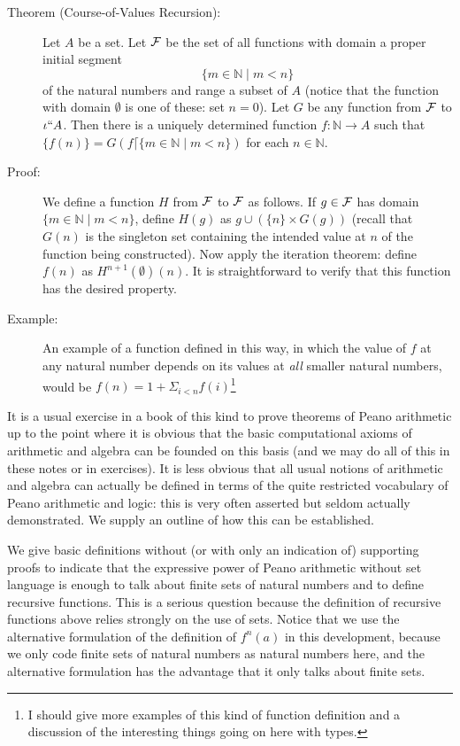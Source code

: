 \documentclass[12pt]{book}
\begin{document}
\begin{description}

\item[Theorem (Course-of-Values Recursion):] Let $A$ be a set.  Let
${\cal F}$ be the set of all functions with domain a proper initial
segment $$\{m \in{\mathbb N}\mid m <n\}$$ of the natural numbers and
range a subset of $A$ (notice that the function with domain
$\emptyset$ is one of these: set $n=0$).  Let $G$ be any function from
$\cal F$ to $\iota``A$.  Then there is a uniquely determined function
$f:{\mathbb N}\rightarrow A$ such that $\{f(n)\} = G(f \lceil \{m \in
{\mathbb N} \mid m < n\})$ for each $n \in {\mathbb N}$.

\item[Proof:] We define a function $H$ from ${\cal F}$ to ${\cal F}$
as follows.  If $g \in {\cal F}$ has domain $\{m \in {\mathbb N}\mid
m<n\}$, define $H(g)$ as $g \cup (\{n\} \times G(g))$ (recall that
$G(n)$ is the singleton set containing the intended value at $n$ of
the function being constructed).  Now apply the iteration theorem:
define $f(n)$ as $H^{n+1}(\emptyset)(n)$.  It is straightforward to verify
that this function has the desired property.

\item[Example:] An example of a function defined in this way, in which
the value of $f$ at any natural number depends on its values at {\em
all\/} smaller natural numbers, would be $f(n) = 1+\Sigma_{i<n}
f(i)$\footnote{I should give more examples of this kind of function definition and a discussion of the interesting things going on here with types.}

\end{description}

It is a usual exercise in a book of this kind to prove theorems of
Peano arithmetic up to the point where it is obvious that the basic
computational axioms of arithmetic and algebra can be founded on this
basis (and we may do all of this in these notes or in exercises).  It
is less obvious that all usual notions of arithmetic and algebra can
actually be defined in terms of the quite restricted vocabulary of
Peano arithmetic and logic: this is very often asserted but seldom
actually demonstrated.  We supply an outline of how this can be
established.

We give basic definitions without (or with only an indication of)
supporting proofs to indicate that the expressive power of Peano
arithmetic without set language is enough to talk about finite sets of
natural numbers and to define recursive functions.  This is a serious
question because the definition of recursive functions above relies
strongly on the use of sets.  Notice that we use the alternative
formulation of the definition of $f^n(a)$ in this development, because
we only code finite sets of natural numbers as natural numbers here,
and the alternative formulation has the advantage that it only talks
about finite sets.
\end{document}
